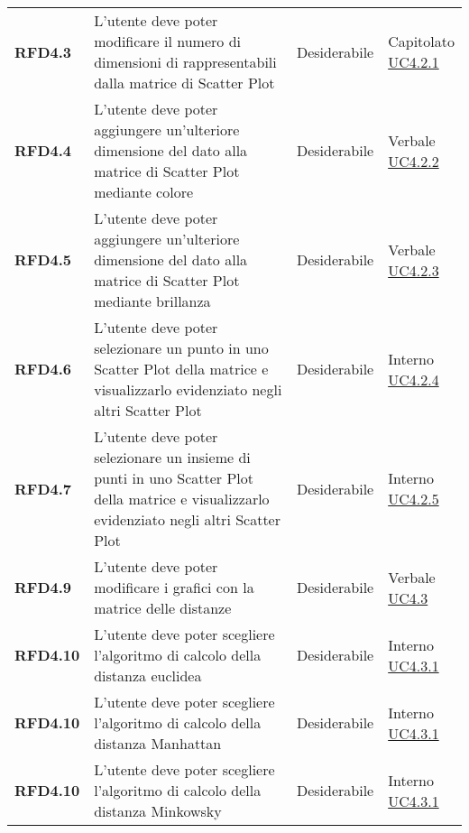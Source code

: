 \begin{longtable}[H]{>{\raggedright\bfseries}m{20mm} >{\raggedright}m{90mm} >{\raggedright}m{28mm} >{\raggedright\arraybackslash}m{30mm}}
    RFD4.3
    & L'utente deve poter modificare il numero di dimensioni di rappresentabili dalla matrice di Scatter Plot
    & Desiderabile
    & \makecell{ Capitolato \\ \hyperref[par:uc4.2.1]{UC4.2.1} }\\

    RFD4.4
    & L'utente deve poter aggiungere un'ulteriore dimensione del dato alla matrice di Scatter Plot mediante colore
    & Desiderabile
    & \makecell{ Verbale \\ \hyperref[par:uc4.2.2]{UC4.2.2} }\\

    RFD4.5
    & L'utente deve poter aggiungere un'ulteriore dimensione del dato alla matrice di Scatter Plot mediante brillanza
    & Desiderabile
    & \makecell{ Verbale \\ \hyperref[par:uc4.2.3]{UC4.2.3} }\\

    RFD4.6
    & L'utente deve poter selezionare un punto in uno Scatter Plot della matrice e visualizzarlo evidenziato negli
    altri Scatter Plot
    & Desiderabile
    & \makecell{ Interno \\ \hyperref[par:uc4.2.4]{UC4.2.4} }\\

    RFD4.7
    & L'utente deve poter selezionare un insieme di punti in uno Scatter Plot della matrice e visualizzarlo evidenziato
    negli altri Scatter Plot
    & Desiderabile
    & \makecell{ Interno \\ \hyperref[par:uc4.2.5]{UC4.2.5} }\\

    RFD4.9
    & L'utente deve poter modificare i grafici con la matrice delle distanze
    & Desiderabile
    & \makecell{ Verbale \\ \hyperref[ssub:uc4.3]{UC4.3} }\\

    RFD4.10
    & L'utente deve poter scegliere l'algoritmo di calcolo della distanza euclidea
    & Desiderabile
    & \makecell{ Interno \\ \hyperref[par:uc4.3.1]{UC4.3.1} }\\

    RFD4.10
    & L'utente deve poter scegliere l'algoritmo di calcolo della distanza Manhattan
    & Desiderabile
    & \makecell{ Interno \\ \hyperref[par:uc4.3.1]{UC4.3.1} }\\

    RFD4.10
    & L'utente deve poter scegliere l'algoritmo di calcolo della distanza Minkowsky
    & Desiderabile
    & \makecell{ Interno \\ \hyperref[par:uc4.3.1]{UC4.3.1} }\\


\end{longtable}
